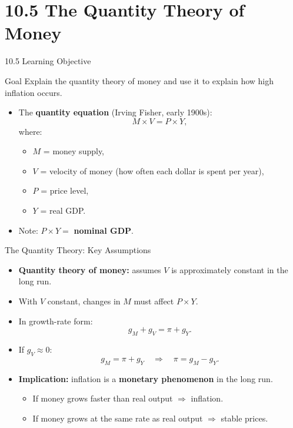 \documentclass[aspectratio=169]{beamer}
\begin{document}
\section{10.5 The Quantity Theory of Money}

\begin{frame}{10.5 Learning Objective}
\transfade
\begin{block}{Goal}
Explain the quantity theory of money and use it to explain how high inflation occurs.
\end{block}
\begin{itemize}[<+->]
  \item The \textbf{quantity equation} (Irving Fisher, early 1900s):
  \[
    M \times V = P \times Y,
  \]
  where:
  \begin{itemize}[<+->]
    \item $M$ = money supply,
    \item $V$ = velocity of money (how often each dollar is spent per year),
    \item $P$ = price level,
    \item $Y$ = real GDP.
  \end{itemize}
  \item Note: $P \times Y = $ \textbf{nominal GDP}.
\end{itemize}
\end{frame}

\begin{frame}{The Quantity Theory: Key Assumptions}
\transfade
\begin{itemize}[<+->]
  \item \textbf{Quantity theory of money:} assumes $V$ is approximately constant in the long run.
  \item With $V$ constant, changes in $M$ must affect $P \times Y$.
  \item In growth-rate form:
  \[
    g_M + g_V = \pi + g_Y.
  \]
  \item If $g_V \approx 0$:
  \[
    g_M = \pi + g_Y \quad \Rightarrow \quad \boxed{\pi = g_M - g_Y}.
  \]
  \item \textbf{Implication:} inflation is a \textbf{monetary phenomenon} in the long run.
  \begin{itemize}[<+->]
    \item If money grows faster than real output $\Rightarrow$ inflation.
    \item If money grows at the same rate as real output $\Rightarrow$ stable prices.
  \end{itemize}
\end{itemize}
\end{frame}
\end{document}
